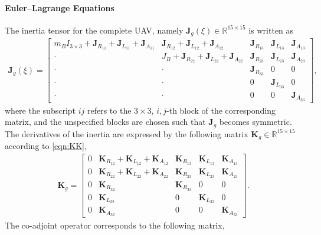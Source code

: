 \documentclass[10pt]{article}
\renewcommand{\Re}{\ensuremath{\mathbb{R}}}
\begin{document}
\paragraph{Euler--Lagrange Equations}

The inertia tensor for the complete UAV, namely $\mathbf{J}_g(\xi)\in\Re^{15\times 15}$ is written as
\begin{align}
    \mathbf{J}_g(\xi) = \begin{bmatrix}
        m_B I_{3\times 3} + \mathbf{J}_{R_{11}} + \mathbf{J}_{L_{11}} + \mathbf{J}_{A_{11}}
        & \mathbf{J}_{R_{12 }} + \mathbf{J}_{L_{12}} + \mathbf{J}_{A_{12}}
        & \mathbf{J}_{R_{13 }}
        & \mathbf{J}_{L_{13}} 
        & \mathbf{J}_{A_{13}} \\
        \cdot & J_B + \mathbf{J}_{R_{22}} + \mathbf{J}_{L_{22}} + \mathbf{J}_{A_{22}}
        & \mathbf{J}_{R_{23}} 
        & \mathbf{J}_{L_{23}} 
        & \mathbf{J}_{A_{23}} \\
        \cdot & \cdot &  \mathbf{J}_{R_{33}}
              & 0 & 0 \\
        \cdot & \cdot & 0
              & \mathbf{J}_{L_{33}} & 0 \\
        \cdot & \cdot & 0 & 0 & \mathbf{J}_{A_{33}}
    \end{bmatrix},
\end{align}
where the subscript $ij$ refers to the $3\times 3$, $i,j$-th block of the corresponding matrix, and the unspecified blocks are chosen such that $\mathbf{J}_g$ becomes symmetric.
The derivatives of the inertia are expressed by the following matrix $\mathbf{K}_g\in\Re^{15\times 15}$ according to \eqref{eqn:KK}, 
\begin{align}
    \mathbf{K}_g = \begin{bmatrix}
        0 & \mathbf{K}_{R_{12}} + \mathbf{K}_{L_{12}} + \mathbf{K}_{A_{12}} & \mathbf{K}_{R_{13}} & \mathbf{K}_{L_{13}} & \mathbf{K}_{A_{13}}\\
        0 & \mathbf{K}_{R_{22}} + \mathbf{K}_{L_{22}} + \mathbf{K}_{A_{22}} & \mathbf{K}_{R_{23}} & \mathbf{K}_{L_{23}} & \mathbf{K}_{A_{23}} \\
        0 & \mathbf{K}_{R_{32}} & \mathbf{K}_{R_{33}} & 0 & 0 \\
        0 & \mathbf{K}_{L_{32}} & 0 & \mathbf{K}_{L_{33}} & 0 \\
        0 & \mathbf{K}_{A_{32}} & 0 & 0 & \mathbf{K}_{A_{33}}
    \end{bmatrix}.
\end{align}
The co-adjoint operator corresponds to the following matrix,
\end{document}
